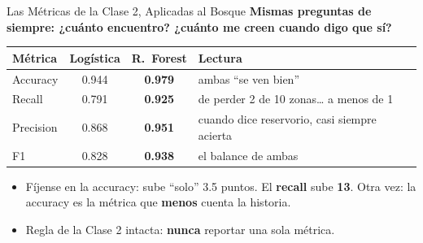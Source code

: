 \documentclass[aspectratio=169, 11pt]{beamer}
\begin{document}
\begin{frame}[shrink=10]{Las Métricas de la Clase 2, Aplicadas al Bosque}
  \vspace{-4pt}
  {\small\color{arcaDark}\bfseries
    Mismas preguntas de siempre: ¿cuánto encuentro? ¿cuánto me creen cuando digo que sí?}

  \vspace{6pt}
  \centering
  {\footnotesize
  \renewcommand{\arraystretch}{1.55}
  \begin{tabular}{@{}l c c l@{}}
    \toprule
    {\bfseries\color{arcaDark} Métrica} & {\bfseries\color{textMuted} Logística} & {\bfseries\color{codeGreen} R.\ Forest}
      & {\bfseries\color{arcaDark} Lectura} \\
    \midrule
    \rowcolor{arcaGray}
    Accuracy & 0.944 & \bfseries 0.979 & ambas ``se ven bien'' \\
    Recall & 0.791 & \bfseries 0.925 & de perder 2 de 10 zonas\ldots{} a menos de 1 \\
    \rowcolor{arcaGray}
    Precision & 0.868 & \bfseries 0.951 & cuando dice reservorio, casi siempre acierta \\
    F1 & 0.828 & \bfseries 0.938 & el balance de ambas \\
    \bottomrule
  \end{tabular}
  }

  \vspace{8pt}
  {\footnotesize\color{textMuted}
  \begin{itemize}\setlength{\itemsep}{4pt}
    \item[{\color{arcaRed}\scriptsize\faExclamationTriangle}]
      Fíjense en la accuracy: sube ``solo'' 3.5 puntos. El \textbf{recall} sube \textbf{13}.
      Otra vez: la accuracy es la métrica que \textbf{menos} cuenta la historia.
    \item[{\color{codeGreen}\scriptsize\faCheck}]
      Regla de la Clase 2 intacta: \textbf{nunca} reportar una sola métrica.
  \end{itemize}
  }
\end{frame}
\end{document}

